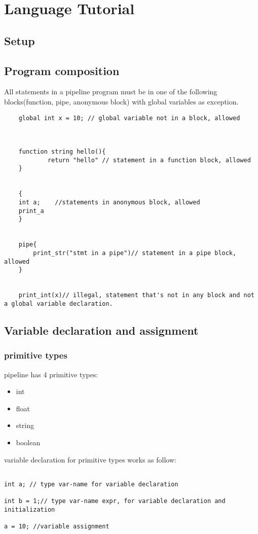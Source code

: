 \documentclass[./Report_main.tex]{subfiles}
\begin{document}


\chapter{Language Tutorial}
\section{Setup}
\section{Program composition}
All statements in a pipeline program must be in one of the following blocks(function, pipe, anonymous block) with global variables as exception.\\
\begin{lstlisting}
    global int x = 10; // global variable not in a block, allowed
    
    
    
    function string hello(){
            return "hello" // statement in a function block, allowed
    }
    
    
    {
    int a;    //statements in anonymous block, allowed
    print_a
    }
    
    
    pipe{
        print_str("stmt in a pipe")// statement in a pipe block, allowed
    }
    
    
    print_int(x)// illegal, statement that's not in any block and not a global variable declaration.
\end{lstlisting}
\section{Variable declaration and assignment}
\subsection{primitive types}
pipeline has 4 primitive types:
\begin{itemize}
    \item int
    \item float
    \item string
    \item boolean
\end{itemize}
variable declaration for primitive types works as follow:
\begin{lstlisting}
    
int a; // type var-name for variable declaration
    
int b = 1;// type var-name expr, for variable declaration and initialization
    
a = 10; //variable assignment
\end{lstlisting}
\end{document}
